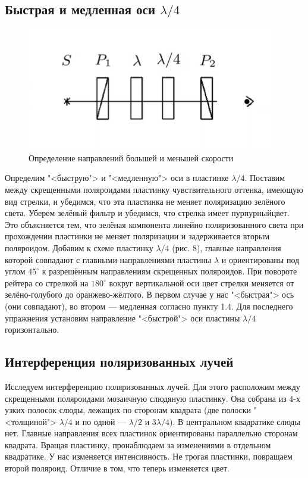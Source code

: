\newpage

\subsection{Быстрая и медленная оси $ \lambda/4 $}

\begin{figure}
	\includegraphics[width=\linewidth]{8}
	\caption{Определение направлений
большей и меньшей скорости}
	\label{ris 8}
\end{figure}

Определим "<быструю"> и "<медленную"> оси в пластинке $ \lambda/4 $. Поставим между скрещенными поляроидами пластинку чувствительного оттенка, имеющую вид стрелки, и убедимся, что эта пластинка не меняет поляризацию зелёного света. Уберем зелёный фильтр и убедимся, что стрелка имеет пурпурныйцвет. Это объясняется тем, что зелёная компонента линейно поляризованного света при прохождении пластинки не меняет поляризации и задерживается вторым поляроидом. Добавим к схеме пластинку $ \lambda/4 $ (рис. 8), главные направления которой совпадают с главными направлениями пластины $ \lambda $ и ориентированы под углом $ 45^\circ $ к разрешённым направлениям скрещенных поляроидов. При повороте рейтера со стрелкой на $ 180^\circ $ вокруг вертикальной оси цвет стрелки меняется от зелёно-голубого до оранжево-жёлтого. В первом случае у нас "<быстрая"> ось (они совпадают), во втором --- медленная согласно пункту 1.4. Для последнего упражнения установим направление "<быстрой"> оси пластины $ \lambda/4 $ горизонтально.

\subsection{Интерференция поляризованных лучей}

Исследуем интерференцию поляризованных лучей. Для этого расположим между скрещенными поляроидами мозаичную слюдяную пластинку. Она собрана из 4-х узких полосок слюды, лежащих по сторонам квадрата (две полоски "<толщиной"> $ \lambda/4 $ и по одной --- $ \lambda/2 $ и $ 3\lambda/4 $). В центральном квадратике слюды нет. Главные направления всех пластинок ориентированы параллельно сторонам квадрата. Вращая пластинку, пронаблюдаем за изменениями в отдельном квадратике. У нас изменяется интенсивность.  Не трогая пластинки, повращаем второй поляроид. Отличие в том, что теперь изменяется цвет.

